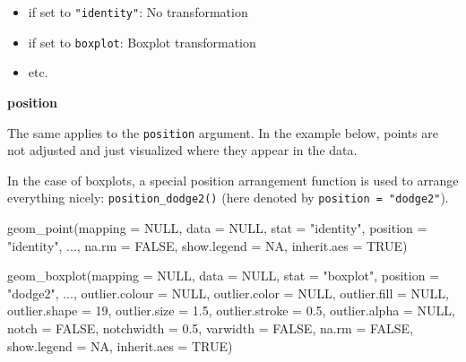 \documentclass[]{book}
\newenvironment{Shaded}{}{}
\newcommand{\DataTypeTok}[1]{#1}
\newcommand{\DecValTok}[1]{#1}
\newcommand{\FloatTok}[1]{#1}
\newcommand{\KeywordTok}[1]{\textcolor[rgb]{0.00,0.00,1.00}{#1}}
\newcommand{\NormalTok}[1]{#1}
\newcommand{\OtherTok}[1]{\textcolor[rgb]{1.00,0.25,0.00}{#1}}
\newcommand{\StringTok}[1]{\textcolor[rgb]{0.00,0.50,0.50}{#1}}
\begin{document}
\begin{itemize}
\item
  if set to \texttt{"identity"}: No transformation
\item
  if set to \texttt{boxplot}: Boxplot transformation
\item
  etc.
\end{itemize}

\textbf{position}

The same applies to the \texttt{position} argument.
In the example below, points are not adjusted and just visualized where they appear in the data.

In the case of boxplots, a special position arrangement function is used to arrange everything nicely: \texttt{position\_dodge2()} (here denoted by \texttt{position\ =\ "dodge2"}).

\begin{Shaded}
\begin{Highlighting}[]
\KeywordTok{geom_point}\NormalTok{(}\DataTypeTok{mapping =} \OtherTok{NULL}\NormalTok{, }\DataTypeTok{data =} \OtherTok{NULL}\NormalTok{, }\DataTypeTok{stat =} \StringTok{"identity"}\NormalTok{,}
  \DataTypeTok{position =} \StringTok{"identity"}\NormalTok{, ..., }\DataTypeTok{na.rm =} \OtherTok{FALSE}\NormalTok{, }\DataTypeTok{show.legend =} \OtherTok{NA}\NormalTok{,}
  \DataTypeTok{inherit.aes =} \OtherTok{TRUE}\NormalTok{)}

\KeywordTok{geom_boxplot}\NormalTok{(}\DataTypeTok{mapping =} \OtherTok{NULL}\NormalTok{, }\DataTypeTok{data =} \OtherTok{NULL}\NormalTok{, }\DataTypeTok{stat =} \StringTok{"boxplot"}\NormalTok{,}
  \DataTypeTok{position =} \StringTok{"dodge2"}\NormalTok{, ..., }\DataTypeTok{outlier.colour =} \OtherTok{NULL}\NormalTok{,}
  \DataTypeTok{outlier.color =} \OtherTok{NULL}\NormalTok{, }\DataTypeTok{outlier.fill =} \OtherTok{NULL}\NormalTok{, }\DataTypeTok{outlier.shape =} \DecValTok{19}\NormalTok{,}
  \DataTypeTok{outlier.size =} \FloatTok{1.5}\NormalTok{, }\DataTypeTok{outlier.stroke =} \FloatTok{0.5}\NormalTok{, }\DataTypeTok{outlier.alpha =} \OtherTok{NULL}\NormalTok{,}
  \DataTypeTok{notch =} \OtherTok{FALSE}\NormalTok{, }\DataTypeTok{notchwidth =} \FloatTok{0.5}\NormalTok{, }\DataTypeTok{varwidth =} \OtherTok{FALSE}\NormalTok{, }\DataTypeTok{na.rm =} \OtherTok{FALSE}\NormalTok{,}
  \DataTypeTok{show.legend =} \OtherTok{NA}\NormalTok{, }\DataTypeTok{inherit.aes =} \OtherTok{TRUE}\NormalTok{)}
\end{Highlighting}
\end{Shaded}
\end{document}
